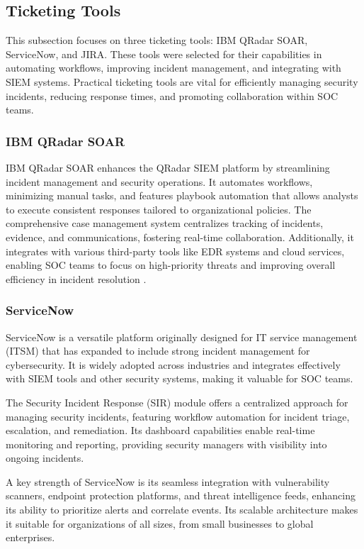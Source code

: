 \subsection{Ticketing Tools}

This subsection focuses on three ticketing tools: IBM QRadar SOAR, ServiceNow, and JIRA. 
These tools were selected for their capabilities in automating workflows, improving incident management, and integrating with \gls{SIEM} systems. 
Practical ticketing tools are vital for efficiently managing security incidents, reducing response times, and promoting collaboration within \gls{SOC} teams.

\subsubsection{IBM QRadar SOAR}
IBM QRadar SOAR enhances the QRadar SIEM platform by streamlining incident management and security operations. 
It automates workflows, minimizing manual tasks, and features playbook automation that allows analysts to execute consistent responses tailored to organizational policies. 
The comprehensive case management system centralizes tracking of incidents, evidence, and communications, fostering real-time collaboration. 
Additionally, it integrates with various third-party tools like EDR systems and cloud services, enabling SOC teams to focus on high-priority threats and improving overall efficiency in incident resolution \parencite{ibm}.

\subsubsection{ServiceNow}
ServiceNow is a versatile platform originally designed for IT service management (ITSM) that has expanded to include strong incident management for cybersecurity. 
It is widely adopted across industries and integrates effectively with SIEM tools and other security systems, making it valuable for SOC teams.

The Security Incident Response (SIR) module offers a centralized approach for managing security incidents, featuring workflow automation for incident triage, escalation, and remediation. 
Its dashboard capabilities enable real-time monitoring and reporting, providing security managers with visibility into ongoing incidents.

A key strength of ServiceNow is its seamless integration with vulnerability scanners, endpoint protection platforms, and threat intelligence feeds, enhancing its ability to prioritize alerts and correlate events. 
Its scalable architecture makes it suitable for organizations of all sizes, from small businesses to global enterprises.

